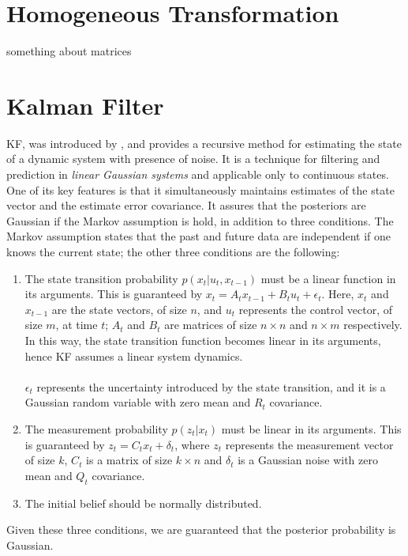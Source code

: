 \section{Homogeneous Transformation}
\label{sec:chapter1:transform}
something about matrices

\section{Kalman Filter}
\label{sec:chapter1:kf}
\nocite{intro-robotics}

\ac{KF}, was introduced by \cite{kalman}, and provides a recursive method for estimating the state of a dynamic system with presence of noise. It is a technique for filtering and prediction in \emph{linear Gaussian systems} and applicable only to continuous states. One of its key features is that it simultaneously maintains estimates of the state vector and the estimate error covariance. It assures that the posteriors are Gaussian if the Markov assumption is hold, in addition to three conditions. The Markov assumption states that the past and future data are independent if one knows the current state; the other three conditions are the following:
\begin{enumerate}
    \item{The state transition probability $p\left( x_t | u_t, x_{t-1}\right)$ must be a linear function in its arguments. This is guaranteed by $ x_t = A_t x_{t-1} + B_t u_t + \epsilon_t $. Here, $x_t$ and $x_{t-1}$ are the state vectors, of size $n$, and $u_t$ represents the control vector, of size $m$, at time $t$; $A_t$ and $B_t$ are matrices of size $n \times n$ and $n\times m$ respectively. In this way, the state transition function becomes linear in its arguments, hence KF assumes a linear system dynamics. \\\\ $\epsilon_t$ represents the uncertainty introduced by the state transition, and it is a Gaussian random variable with zero mean and $R_t$ covariance.}
    \item{The measurement probability $p\left(z_t | x_t\right)$ must be linear in its arguments. This is guaranteed by $z_t = C_t x_t + \delta_t$, where $z_t$ represents the measurement vector of size $k$, $C_t$ is a matrix of size $k \times n$ and $\delta_t$ is a Gaussian noise with zero mean and $Q_t$ covariance.}
    \item{The initial belief should be normally distributed.}
\end{enumerate}
Given these three conditions, we are guaranteed that the posterior probability is Gaussian.

